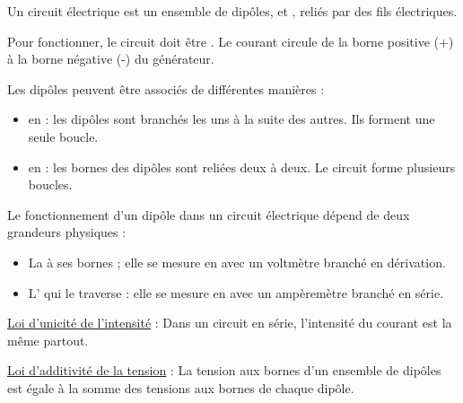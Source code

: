 \documentclass[11pt,a4paper]{article}
\begin{document}
\pagination



Un circuit électrique est un ensemble de dipôles,  et , reliés par des fils électriques.

Pour fonctionner, le circuit doit être . Le courant circule de la borne positive (+) à la borne négative (-) du générateur.


Les dipôles peuvent être associés de différentes manières :

\begin{itemize}
    \item en  : les dipôles sont branchés les uns à la suite des autres. Ils forment une seule boucle.
    \item en  : les bornes des dipôles sont reliées deux à deux. Le circuit forme plusieurs boucles.
\end{itemize}



Le fonctionnement d’un dipôle dans un circuit électrique dépend de deux grandeurs physiques :

\begin{itemize}
    \item La  à ses bornes ; elle se mesure en  avec un voltmètre branché en dérivation.
    \item L' qui le traverse : elle se mesure en  avec un ampèremètre branché en série.
\end{itemize}



\uline{Loi d’unicité de l’intensité} : Dans un circuit en série, l’intensité du courant est la même partout.

\uline{Loi d’additivité de la tension} : La tension aux bornes d’un ensemble de dipôles est égale à la somme des tensions aux bornes de chaque dipôle.


\end{document}
